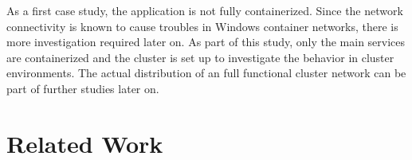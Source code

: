 As a first case study, the application is not fully containerized. Since the network connectivity is known to cause troubles in \ac{Windows} container networks, there is more investigation required later on. As part of this study, only the main services are containerized and the cluster is set up to investigate the behavior in cluster environments. The actual distribution of an full functional cluster network can be part of further studies later on.

\section{Related Work}
